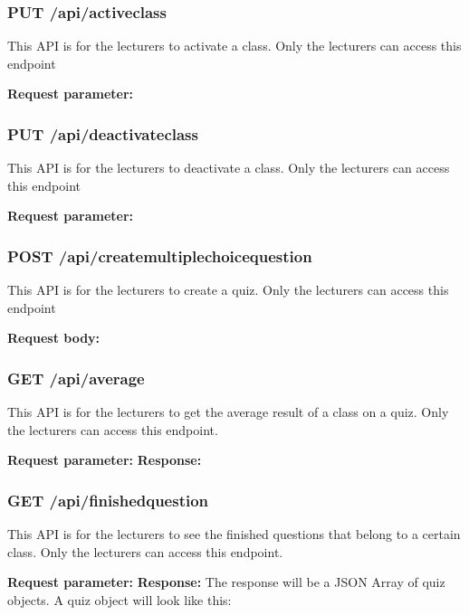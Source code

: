 \documentclass[a4paper, 11pt,openany]{book} %
\begin{document}
\subsubsection{PUT /api/activeclass}
This API is for the lecturers to activate a class. Only the lecturers can access this endpoint\par
\textbf{Request parameter:}

\subsubsection{PUT /api/deactivateclass}
This API is for the lecturers to deactivate a class. Only the lecturers can access this endpoint\par
\textbf{Request parameter:}

\subsubsection{POST /api/createmultiplechoicequestion}
This API is for the lecturers to create a quiz. Only the lecturers can access this endpoint\par
\textbf{Request body:}

\subsubsection{GET /api/average}
This API is for the lecturers to get the average result of a class on a quiz. Only the lecturers can access this endpoint. \par
\textbf{Request parameter:}
\textbf{Response:}

\subsubsection{GET /api/finishedquestion}
This API is for the lecturers to see the finished questions that belong to a certain class. Only the lecturers can access this endpoint. \par
\textbf{Request parameter:}
\textbf{Response:}
The response will be a JSON Array of quiz objects. A quiz object will look like this:
\end{document}
